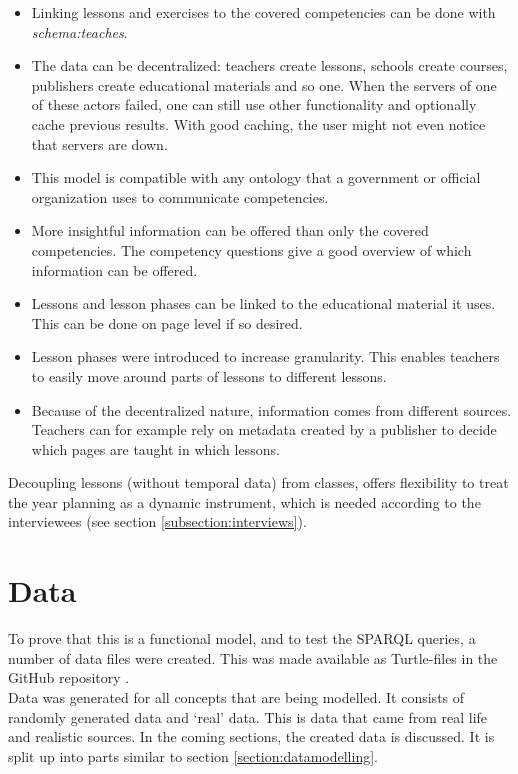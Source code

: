 \documentclass[a4paper]{report}
\begin{document}
    \begin{itemize}
        \item Linking lessons and exercises to the covered competencies can be done with \textit{schema:teaches}.
        \item The data can be decentralized: teachers create lessons, schools create courses, publishers create educational materials and so one. When the servers of one of these actors failed, one can still use other functionality and optionally cache previous results. With good caching, the user might not even notice that servers are down.
        \item This model is compatible with any ontology that a government or official organization uses to communicate competencies.
        \item More insightful information can be offered than only the covered competencies. The competency questions give a good overview of which information can be offered.
        \item Lessons and lesson phases can be linked to the educational material it uses. This can be done on page level if so desired.
        \item Lesson phases were introduced to increase granularity. This enables teachers to easily move around parts of lessons to different lessons.
        \item Because of the decentralized nature, information comes from different sources. Teachers can for example rely on metadata created by a publisher to decide which pages are taught in which lessons.
    \end{itemize}
    Decoupling lessons (without temporal data) from classes, offers flexibility to treat the year planning as a dynamic instrument, which is needed according to the interviewees (see section \ref{subsection:interviews}).


    \chapter{Data}
    \label{section:data}
    To prove that this is a functional model, and to test the SPARQL queries, a number of data files were created. This was made available as Turtle-files in the GitHub repository \cite{repo}.\\
    Data was generated for all concepts that are being modelled. It consists of randomly generated data and `real' data. This is data that came from real life and realistic sources.
    In the coming sections, the created data is discussed. It is split up into parts similar to section \ref{section:datamodelling}.
\end{document}
